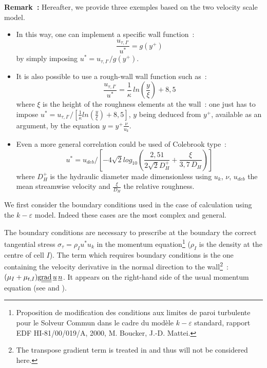 {\bf Remark~:} Hereafter, we provide three exemples
based on the two velocity scale model.
\begin{itemize}
\item In this way, one can implement a specific wall function~:
$$\displaystyle\frac{u_{\tau,I'}}{u^*}=g(y^+)$$
by simply imposing
$\displaystyle{u^*}=u_{\tau,I'}/g(y^+)$.
\item It is also possible to use a rough-wall wall function such as~:
$$\displaystyle\frac{u_{\tau,I'}}{u^*}=\displaystyle\frac{1}{\kappa}\,ln(\frac{y}{\xi})+8,5$$
where $\xi$ is the height of the roughness elements at the wall~: one just has to impose
$\displaystyle u^*=u_{\tau,I'}/\left[\frac{1}{\kappa}ln(\frac{y}{\xi})+8,5\right]$,
 $y$ being deduced from $y^+$, available as an argument, by the equation
$\displaystyle y=y^+\frac{\nu}{u_k}$.
\item Even a more general correlation could be used of
Colebrook type~:
$$u^*=u_{deb}/\left[-4\sqrt{2}log_{10}\left(\displaystyle\frac{2,51}{2\sqrt{2}D_H^+}+\frac{\xi}{3,7\,D_H}\right)\right]$$
where $D_H^+$ is the hydraulic diameter made dimensionless using $u_k$, $\nu$,
$u_{deb}$ the mean streamwise velocity
and $\displaystyle\frac{\xi}{D_H}$ the relative roughness.
\end{itemize}



We first consider the boundary conditions used in the case of calculation using the
 $k-\varepsilon$ model. Indeed these cases are the most complex and general.

The boundary conditions are necessary to prescribe at the boundary
 the correct tangential stress $\sigma_\tau=\rho_Iu^*u_k$ in the momentum
equation\footnote{Proposition de modification des conditions aux limites de
paroi turbulente pour le Solveur Commun dans le cadre du mod\`ele
$k-\varepsilon$ standard, rapport EDF HI-81/00/019/A, 2000, M. Boucker, J.-D. Mattei.}
($\rho_I$ is the density at the centre of cell $I$).
The term which requires boundary conditions is the one containing the
velocity derivative in the normal direction to the wall\footnote{The transpose gradient term is treated in 
and thus will not be considered here.}~:
$(\mu_I+\mu_{t,I})\text{g}\underline{\underline{{\text{rad}}}}\,{\underline{u}}\,\underline{n}$. It appears on the
right-hand side of the usual momentum equation (see  and ).

